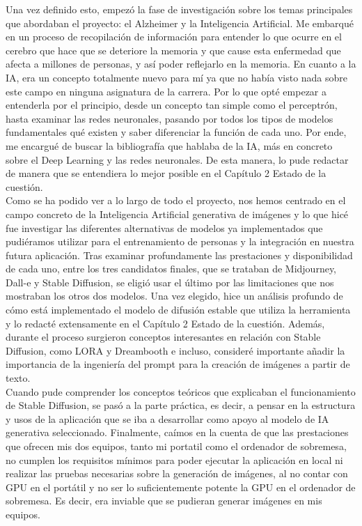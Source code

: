 Una vez definido esto, empezó la fase de investigación sobre los temas principales que abordaban el proyecto: el Alzheimer y la Inteligencia Artificial. Me embarqué en un proceso de recopilación de información para entender lo que ocurre en el cerebro que hace que se deteriore la memoria y que cause esta enfermedad que afecta a millones de personas, y así poder reflejarlo en la memoria. En cuanto a la IA, era un concepto totalmente nuevo para mí ya que no había visto nada sobre este campo en ninguna asignatura de la carrera. Por lo que opté empezar a entenderla por el principio, desde un concepto tan simple como el perceptrón, hasta examinar las redes neuronales, pasando por todos los tipos de modelos fundamentales qué existen y saber diferenciar la función de cada uno. Por ende, me encargué de buscar la bibliografía que hablaba de la IA, más en concreto sobre el Deep Learning y las redes neuronales. De esta manera, lo pude redactar de manera que se entendiera lo mejor posible en el Capítulo 2 Estado de la cuestión. \\

Como se ha podido ver a lo largo de todo el proyecto, nos hemos centrado en el campo concreto de la Inteligencia Artificial generativa de imágenes y lo que hicé fue investigar las diferentes alternativas de modelos ya implementados que pudiéramos utilizar para el entrenamiento de personas y la integración en nuestra futura aplicación. Tras examinar profundamente las prestaciones y disponibilidad de cada uno, entre los tres candidatos finales, que se trataban de Midjourney, Dall-e y Stable Diffusion, se eligió usar el último por las limitaciones que nos mostraban los otros dos modelos. Una vez elegido, hice un análisis profundo de cómo está implementado el modelo de difusión estable que utiliza la herramienta y lo redacté extensamente en el Capítulo 2 Estado de la cuestión. Además, durante el proceso surgieron conceptos interesantes en relación con Stable Diffusion, como LORA y Dreambooth e incluso, consideré importante añadir la importancia de la ingeniería del prompt para la creación de imágenes a partir de texto. \\

Cuando pude comprender los conceptos teóricos que explicaban el funcionamiento de Stable Diffusion, se pasó a la parte práctica, es decir, a pensar en la estructura y usos de la aplicación que se iba a desarrollar como apoyo al modelo de IA generativa seleccionado. Finalmente, caímos en la cuenta de que las prestaciones que ofrecen mis dos equipos, tanto mi portatil como el ordenador de sobremesa, no cumplen los requisitos mínimos para poder ejecutar la aplicación en local ni realizar las pruebas necesarias sobre la generación de imágenes, al no contar con GPU en el portátil y no ser lo suficientemente potente la GPU en el ordenador de sobremesa. Es decir, era inviable que se pudieran generar imágenes en mis equipos.\\

